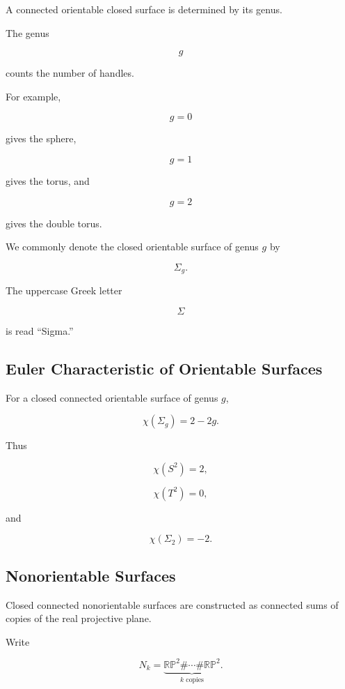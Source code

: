 A connected orientable closed surface is determined by its genus.

The genus

\[
\boxed{
g
}
\]

counts the number of handles.

For example,

\[
g=0
\]

gives the sphere,

\[
g=1
\]

gives the torus, and

\[
g=2
\]

gives the double torus.

We commonly denote the closed orientable surface of genus \(g\) by

\[
\boxed{
\Sigma_g.
}
\]

The uppercase Greek letter

\[
\Sigma
\]

is read ``Sigma.''

\subsection{Euler Characteristic of Orientable Surfaces}
\label{subsec:euler-orientable-surfaces}

For a closed connected orientable surface of genus \(g\),

\[
\boxed{
\chi(\Sigma_g)=2-2g.
}
\]

Thus

\[
\chi(S^2)=2,
\]

\[
\chi(T^2)=0,
\]

and

\[
\chi(\Sigma_2)=-2.
\]

\subsection{Nonorientable Surfaces}
\label{subsec:nonorientable-surfaces-geometric}

Closed connected nonorientable surfaces are constructed as connected sums
of copies of the real projective plane.

Write

\[
\boxed{
N_k
=
\underbrace{
\mathbb{RP}^2
\#\cdots\#
\mathbb{RP}^2
}_{k\text{ copies}}.
}
\]

